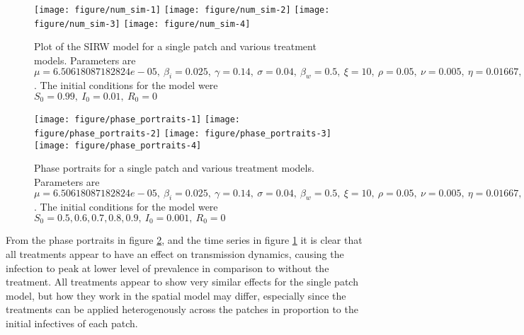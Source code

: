 \documentclass[12pt]{article}\usepackage[]{graphicx}\usepackage[]{color}
\newenvironment{knitrout}{}{} %
\begin{document}
\begin{knitrout}
\color{fgcolor}\begin{figure}

{\centering \texttt{[image: figure/num\_sim-1]} 
\texttt{[image: figure/num\_sim-2]} 
\texttt{[image: figure/num\_sim-3]} 
\texttt{[image: figure/num\_sim-4]} 

}

\caption{\label{fig:num.sim} Plot of the SIRW model for a single patch and various treatment models. Parameters are $\mu=6.50618087182824e-05,\ \beta_i=0.025,\ \gamma=0.14,\ \sigma=0.04,\ \beta_w=0.5,\ \xi=10,\ \rho=0.05,\ \nu=0.005,\ \eta=0.01667,\ \alpha=0$. The initial conditions for the model were $S_0=0.99,\ I_0=0.01,\ R_0=0$}\label{fig:num.sim}
\end{figure}


\end{knitrout}
\begin{knitrout}
\color{fgcolor}\begin{figure}

{\centering \texttt{[image: figure/phase\_portraits-1]} 
\texttt{[image: figure/phase\_portraits-2]} 
\texttt{[image: figure/phase\_portraits-3]} 
\texttt{[image: figure/phase\_portraits-4]} 

}

\caption{\label{fig:phase.portraits} Phase portraits for a single patch and various treatment models. Parameters are $\mu=6.50618087182824e-05,\ \beta_i=0.025,\ \gamma=0.14,\ \sigma=0.04,\ \beta_w=0.5,\ \xi=10,\ \rho=0.05,\ \nu=0.005,\ \eta=0.01667,\ \alpha=0$. The initial conditions for the model were $S_0= 0.5, 0.6, 0.7, 0.8, 0.9,\ I_0=0.001,\ R_0=0$}\label{fig:phase.portraits}
\end{figure}


\end{knitrout}
\FloatBarrier
From the phase portraits in figure \ref{fig:phase.portraits}, and the time series in figure \ref{fig:num.sim} it is clear that all treatments appear to have an effect on transmission dynamics, causing the infection to peak at lower level of prevalence in comparison to without the treatment.
All treatments appear to show very similar effects for the single patch model, but how they work in the spatial model may differ, especially since the treatments can be applied heterogenously across the patches in proportion to the initial infectives of each patch.
\end{document}
